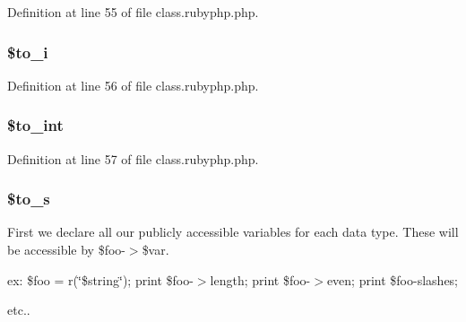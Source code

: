 Definition at line 55 of file class.\-rubyphp.\-php.

\hypertarget{class_pierce_moore_1_1_ruby_p_h_p_1_1r_afecc47a810cf510aff6387286b9c0e73}{
\subsubsection[{\$to\-\_\-i}]{\setlength{\rightskip}{0pt plus 5cm}\${\bf to\-\_\-i}}}\label{class_pierce_moore_1_1_ruby_p_h_p_1_1r_afecc47a810cf510aff6387286b9c0e73}


Definition at line 56 of file class.\-rubyphp.\-php.

\hypertarget{class_pierce_moore_1_1_ruby_p_h_p_1_1r_a41eb7bfd09e3b6ad118551accfaad638}{
\subsubsection[{\$to\-\_\-int}]{\setlength{\rightskip}{0pt plus 5cm}\${\bf to\-\_\-int}}}\label{class_pierce_moore_1_1_ruby_p_h_p_1_1r_a41eb7bfd09e3b6ad118551accfaad638}


Definition at line 57 of file class.\-rubyphp.\-php.

\hypertarget{class_pierce_moore_1_1_ruby_p_h_p_1_1r_a5469620d055732b419fff71704232d2f}{
\subsubsection[{\$to\-\_\-s}]{\setlength{\rightskip}{0pt plus 5cm}\${\bf to\-\_\-s}}}\label{class_pierce_moore_1_1_ruby_p_h_p_1_1r_a5469620d055732b419fff71704232d2f}
First we declare all our publicly accessible variables for each data type. These will be accessible by \$foo-\/$>$\$var.

ex\-: \$foo = r(\char`\"{}\$string\char`\"{}); print \$foo-\/$>$length; print \$foo-\/$>$even; print \$foo-\/slashes;

etc.. 


